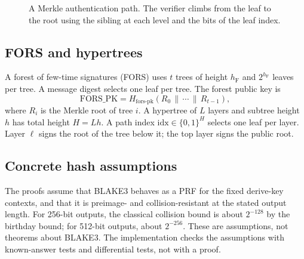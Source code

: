 \documentclass[11pt,a4paper]{article}
\theoremstyle{remark}
\newcommand{\concat}{\,\|\,}
\newcommand{\bits}{\{0,1\}}
\begin{document}
\begin{figure}[ht]
\centering
{}
\caption{A Merkle authentication path. The verifier climbs from the leaf to the
root using the sibling at each level and the bits of the leaf index.}
\label{fig:merkle}
\end{figure}

\subsection{FORS and hypertrees}

A forest of few-time signatures (FORS) uses \(t\) trees of height \(h_{\mathrm{F}}\)
and \(2^{h_{\mathrm{F}}}\) leaves per tree. A message digest selects one leaf per
tree. The forest public key is
\[
\mathrm{FORS\_PK}
=
H_{\text{fors-pk}}(R_0\concat\cdots\concat R_{t-1}),
\]
where \(R_i\) is the Merkle root of tree \(i\). A hypertree of \(L\) layers and
subtree height \(h\) has total height \(H=Lh\). A path index
\(\mathrm{idx}\in\bits^H\) selects one leaf per layer. Layer \(\ell\) signs the
root of the tree below it; the top layer signs the public root.

\subsection{Concrete hash assumptions}

The proofs assume that BLAKE3 behaves as a PRF for the fixed derive-key
contexts, and that it is preimage- and collision-resistant at the stated output
length. For 256-bit outputs, the classical collision bound is about
\(2^{-128}\) by the birthday bound; for 512-bit outputs, about \(2^{-256}\).
These are assumptions, not theorems about BLAKE3. The implementation checks the
assumptions with known-answer tests and differential tests, not with a proof.
\end{document}

